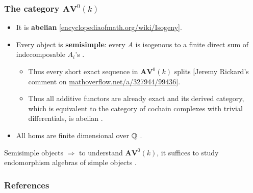 \documentclass[notheorems, hyperref]{beamer}
\theoremstyle{darkgreentheorem}
\theoremstyle{darkbluedefinition}
\theoremstyle{darkredexample}
\theoremstyle{remark}
\newcommand{\avi}{\mathbf{AV}^{0}}
\begin{document}
\begin{frame}
    \frametitle{The category $\avi(k)$}
    \begin{itemize}
	\item It is \textbf{abelian} [\href{https://encyclopediaofmath.org/wiki/Isogeny}{encyclopediaofmath.org/wiki/Isogeny}].
	\item Every object is \textbf{semisimple}: every $A$ is isogenous to a finite direct sum of indecomposable $A_{i}$'s \cite[Prop.~I.10.1]{mil08}.
	    \begin{itemize}
		\item Thus every short exact sequence in $\avi(k)$ splits [Jeremy Rickard's comment on \href{https://mathoverflow.net/a/327944/99436}{mathoverflow.net/a/327944/99436}].
		\item Thus all additive functors are already exact and its derived category, which is equivalent to the category of cochain complexes with trivial differentials, is abelian \cite[III.2.4]{gm03}.
	    \end{itemize}
	\item All homs are finite dimensional over $\mathbb{Q}$ \cite[Thm.~I.10.15]{mil08}.
    \end{itemize}


    \begin{tcolorbox}[colback=yellow!5!white,colframe=orange!75!black]
    Semisimple objects $\Rightarrow $ to understand $\avi(k)$, it suffices to study endomorphism algebras of simple objects \cite[p.~43]{mil08}.	
    \end{tcolorbox}
\end{frame}

\begin{frame}
    \frametitle{References}
    
    
\end{frame}
\end{document}
